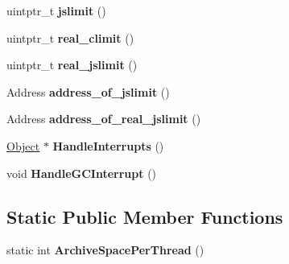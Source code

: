 \begin{DoxyCompactItemize}
\item 
uintptr\+\_\+t {\bfseries jslimit} ()\hypertarget{classv8_1_1internal_1_1_stack_guard_a4bea1f2e4968f6610c790bb459caa506}{}\label{classv8_1_1internal_1_1_stack_guard_a4bea1f2e4968f6610c790bb459caa506}

\item 
uintptr\+\_\+t {\bfseries real\+\_\+climit} ()\hypertarget{classv8_1_1internal_1_1_stack_guard_a42e4c0136070320961e60b3e648b1776}{}\label{classv8_1_1internal_1_1_stack_guard_a42e4c0136070320961e60b3e648b1776}

\item 
uintptr\+\_\+t {\bfseries real\+\_\+jslimit} ()\hypertarget{classv8_1_1internal_1_1_stack_guard_a8e958b6a54c5b3544f348b1b0ce15a89}{}\label{classv8_1_1internal_1_1_stack_guard_a8e958b6a54c5b3544f348b1b0ce15a89}

\item 
Address {\bfseries address\+\_\+of\+\_\+jslimit} ()\hypertarget{classv8_1_1internal_1_1_stack_guard_a64bf18f10b1fef7d8191e4f8a2ab2bc1}{}\label{classv8_1_1internal_1_1_stack_guard_a64bf18f10b1fef7d8191e4f8a2ab2bc1}

\item 
Address {\bfseries address\+\_\+of\+\_\+real\+\_\+jslimit} ()\hypertarget{classv8_1_1internal_1_1_stack_guard_ac386b01202223f24137fb4787ac46e69}{}\label{classv8_1_1internal_1_1_stack_guard_ac386b01202223f24137fb4787ac46e69}

\item 
\hyperlink{classv8_1_1internal_1_1_object}{Object} $\ast$ {\bfseries Handle\+Interrupts} ()\hypertarget{classv8_1_1internal_1_1_stack_guard_a7b36217b84abfba7245753fdc1770fdd}{}\label{classv8_1_1internal_1_1_stack_guard_a7b36217b84abfba7245753fdc1770fdd}

\item 
void {\bfseries Handle\+G\+C\+Interrupt} ()\hypertarget{classv8_1_1internal_1_1_stack_guard_afacde5f293049b8c30f227368d03c3ba}{}\label{classv8_1_1internal_1_1_stack_guard_afacde5f293049b8c30f227368d03c3ba}

\end{DoxyCompactItemize}
\subsection*{Static Public Member Functions}
\begin{DoxyCompactItemize}
\item 
static int {\bfseries Archive\+Space\+Per\+Thread} ()\hypertarget{classv8_1_1internal_1_1_stack_guard_aca52d15703dd748210cc05932ad6ab8f}{}\label{classv8_1_1internal_1_1_stack_guard_aca52d15703dd748210cc05932ad6ab8f}

\end{DoxyCompactItemize}
